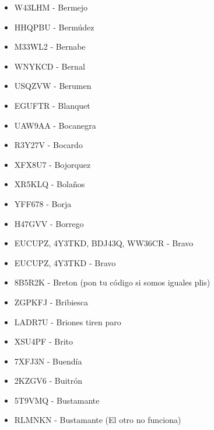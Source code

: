 \begin{itemize}[leftmargin=*,nosep]
\item W43LHM - Bermejo
\item HHQPBU - Bermúdez
\item M33WL2 - Bernabe
\item WNYKCD - Bernal
\item USQZVW -  Berumen
\item EGUFTR - Blanquet
\item UAW9AA - Bocanegra
\item R3Y27V - Bocardo
\item XFX8U7 - Bojorquez
\item XR5KLQ  -  Bolaños
\item YFF678 - Borja
\item H47GVV - Borrego
\item EUCUPZ, 4Y3TKD, BDJ43Q, WW36CR - Bravo
\item EUCUPZ, 4Y3TKD - Bravo
\item 8B5R2K - Breton (pon tu código si somos iguales plis)
\item ZGPKFJ - Bribiesca
\item LADR7U - Briones tiren paro
\item XSU4PF - Brito
\item 7XFJ3N  -  Buendía
\item 2KZGV6 - Buitrón
\item 5T9VMQ  -  Bustamante
\item RLMNKN - Bustamante (El otro no funciona)
\end{itemize}


